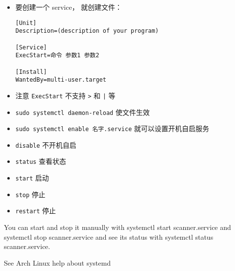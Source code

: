 
\begin{itemize}
\item 要创建一个 service， 就创建文件：
\begin{lstlisting}[language=none,caption=/etc/systemd/system/名字.service]
[Unit]
Description=(description of your program)

[Service]
ExecStart=命令 参数1 参数2

[Install]
WantedBy=multi-user.target
\end{lstlisting}
\item 注意 \verb|ExecStart| 不支持 \verb|>| 和 \verb`|` 等
\item \verb|sudo systemctl daemon-reload| 使文件生效
\item \verb|sudo systemctl enable 名字.service| 就可以设置开机自启服务
\item \verb|disable| 不开机自启
\item \verb|status| 查看状态
\item \verb|start| 启动
\item \verb|stop| 停止
\item \verb|restart| 停止
\end{itemize}

You can start and stop it manually with systemctl start scanner.service and systemctl stop scanner.service and see its status with systemctl status scanner.service.

See Arch Linux help about systemd